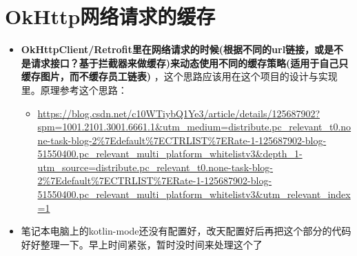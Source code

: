 \documentclass[9pt, b5paper]{article}
\begin{document}
\section{OkHttp网络请求的缓存}
\label{sec-3}
\begin{itemize}
\item \textbf{OkHttpClient/Retrofit里在网络请求的时候(根据不同的url链接，或是不是请求接口？基于拦截器来做缓存)来动态使用不同的缓存策略(适用于自己只缓存图片，而不缓存员工链表)} ，这个思路应该用在这个项目的设计与实现里。原理参考这个思路： 
\begin{itemize}
\item \url{https://blog.csdn.net/c10WTiybQ1Ye3/article/details/125687902?spm=1001.2101.3001.6661.1&utm_medium=distribute.pc_relevant_t0.none-task-blog-2\%7Edefault\%7ECTRLIST\%7ERate-1-125687902-blog-51550400.pc_relevant_multi_platform_whitelistv3&depth_1-utm_source=distribute.pc_relevant_t0.none-task-blog-2\%7Edefault\%7ECTRLIST\%7ERate-1-125687902-blog-51550400.pc_relevant_multi_platform_whitelistv3&utm_relevant_index=1}
\end{itemize}
\item 笔记本电脑上的kotlin-mode还没有配置好，改天配置好后再把这个部分的代码好好整理一下。早上时间紧张，暂时没时间来处理这个了
\end{itemize}
\end{document}
